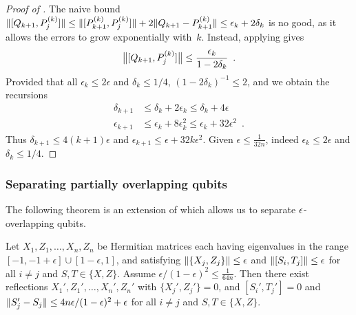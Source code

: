 \documentclass[preprintnumbers,11pt,onecolumn]{article}
\begin{document}
\begin{proof}[Proof of ]
The naive bound ${\| [Q_{k+1}, P_j^{(k)}] \|} \leq {\| [P_{k+1}^{(k)}, P_j^{(k)}] \|} + 2 {\| Q_{k+1} - P_{k+1}^{(k)} \|} \leq \epsilon_k + 2 \delta_k$ is no good, as it allows the errors to grow exponentially with~$k$.  Instead, applying  gives 
\begin{equation*}
{\big\| [Q_{k+1}, P_j^{(k)}] \big\|}
\leq \frac{\epsilon_k}{1 - 2 \delta_k}
 \enspace .
\end{equation*}
Provided that all $\epsilon_k \leq 2 \epsilon$ and $\delta_k \leq 1/4$, $(1 - 2 \delta_k)^{-1} \leq 2$, and we obtain the recursions 
\begin{equation*}\begin{split}
\delta_{k+1} &\leq \delta_k + 2 \epsilon_k \leq \delta_k + 4 \epsilon \\
\epsilon_{k+1} &\leq \epsilon_k + 8 \epsilon_k^2 \leq \epsilon_k + 32 \epsilon^2
 \enspace .
\end{split}\end{equation*}
Thus $\delta_{k+1} \leq 4 (k+1) \epsilon$ and $\epsilon_{k+1} \leq \epsilon + 32 k \epsilon^2$.  Given $\epsilon \leq \tfrac{1}{32 n}$, indeed $\epsilon_k \leq 2 \epsilon$ and $\delta_k \leq 1/4$.  
\end{proof}


\subsubsection{Separating partially overlapping qubits}

The following theorem is an extension of  which allows us to separate ${\epsilon}$-overlapping qubits.   

\begin{theorem} \label{t:manynearlyindependentqubits}
Let $X_1, Z_1, \ldots, X_n, Z_n$ be Hermitian matrices each having eigenvalues in the range $[-1, -1+\epsilon] \cup [1-\epsilon, 1]$, and satisfying ${\| \{X_j, Z_j\} \|} \leq \epsilon$ and ${\| [S_i, T_j] \|} \leq \epsilon$ for all $i \neq j$ and $S, T \in \{X, Z\}$.  Assume $\epsilon / (1-\epsilon)^2 \leq \tfrac{1}{64 n}$.  
Then there exist reflections $X_1', Z_1', \ldots, X_n', Z_n'$ with $\{X_j', Z_j'\} = 0$, and $[S_i', T_j'] = 0$ and ${\| S_j' - S_j \|} \leq 4 n \epsilon / (1-\epsilon)^2 + \epsilon$ for all $i \neq j$ and $S, T \in \{X, Z\}$.  
\end{theorem}
\end{document}
